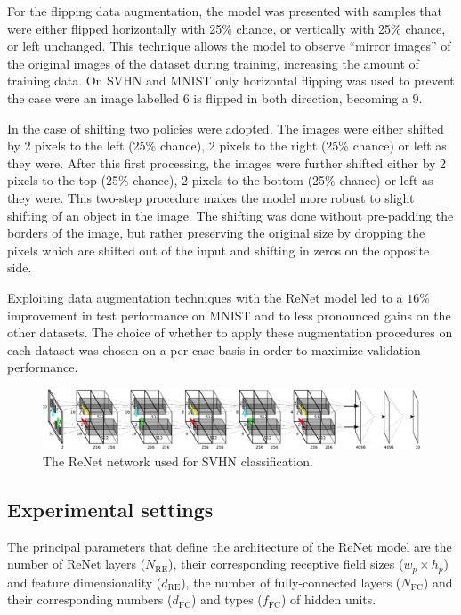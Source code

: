For the flipping data augmentation, the model was presented with samples that
were either flipped horizontally with 25\% chance, or vertically with 25\%
chance, or left unchanged. This technique allows the model to observe ``mirror
images'' of the original images of the dataset during training, increasing the
amount of training data. On SVHN and MNIST only horizontal flipping was used
to prevent the case were an image labelled $6$ is flipped in both direction,
becoming a $9$.

In the case of shifting two policies were adopted. The images were either
shifted by 2 pixels to the left (25\% chance), 2 pixels to the right (25\%
chance) or left as they were. After this first processing, the images were
further shifted either by 2 pixels to the top (25\% chance), 2 pixels to the
bottom (25\% chance) or left as they were. This two-step procedure makes the
model more robust to slight shifting of an object in the image. The shifting
was done without pre-padding the borders of the image, but rather preserving
the original size by dropping the pixels which are shifted out of the input
and shifting in zeros on the opposite side.

Exploiting data augmentation techniques with the ReNet model led to a $16\%$
improvement in test performance on MNIST and to less pronounced gains on the
other datasets. The choice of whether to apply these augmentation procedures on
each dataset was chosen on a per-case basis in order to maximize validation
performance.

\begin{figure}[t]
    \centering
    \includegraphics[height=.14\textheight,width=\columnwidth]{img/renet/renet_svhn.pdf}
    \caption{The ReNet network used for SVHN classification.}
    \label{fig:renet_network}
\end{figure}

\subsection{Experimental settings}

The principal parameters that define the architecture of the ReNet model are
the number of ReNet layers ($N_{\text{RE}}$), their corresponding receptive
field sizes ($w_p \times h_p$) and feature dimensionality ($d_{\text{RE}}$),
the number of fully-connected layers ($N_{\text{FC}}$) and their corresponding
numbers ($d_{\text{FC}}$) and types ($f_{\text{FC}}$) of hidden units.


